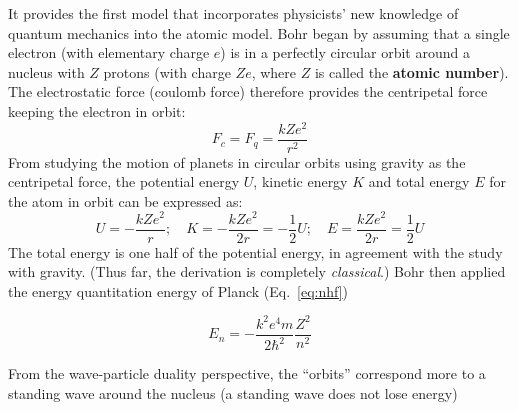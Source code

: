 \documentclass[11pt]{article}
\begin{document}
It provides the first model that incorporates physicists' new knowledge of
quantum mechanics into the atomic model. Bohr began by assuming that a single
electron (with elementary charge $e$) is in a perfectly circular orbit around
a nucleus with $Z$ protons (with charge $Ze$, where $Z$ is called the
\textbf{atomic number}). The electrostatic force (coulomb force) therefore
provides the centripetal force keeping the electron in orbit:
\begin{equation}
  F_c=F_q=\frac{kZe^2}{r^2}
\end{equation}
From studying the motion of planets in circular orbits using gravity as the
centripetal force, the potential energy $U$, kinetic energy $K$ and total
energy $E$ for the atom in orbit can be expressed as:
\begin{equation}
  U=-\frac{kZe^2}{r}; \quad K=-\frac{kZe^2}{2r}=-\frac12 U;\quad
  \boxed{E=\frac{kZe^2}{2r}=\frac12 U}
\end{equation}
The total energy is one half of the potential energy, in agreement with the
study with gravity. (Thus far, the derivation is completely \emph{classical}.)
Bohr then applied the energy quantitation energy of Planck (Eq.~\ref{eq:nhf})

\begin{equation}
  \boxed{E_n=-\frac{k^2e^4m}{2\hbar^2}\frac{Z^2}{n^2}}
\end{equation}
  
From the wave-particle duality perspective, the ``orbits'' correspond more to
a standing wave around the nucleus (a standing wave does not lose energy)
\end{document}
